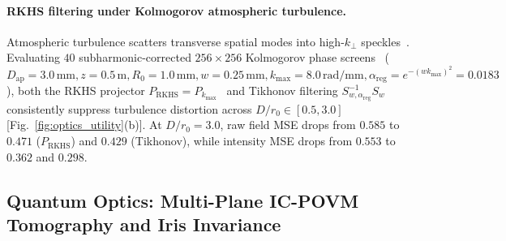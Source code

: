 \documentclass[aps,pra,onecolumn,notitlepage,11pt,tightenlines,amsmath,amssymb,floatfix,longbibliography]{revtex4-2}
\begin{document}
\paragraph*{RKHS filtering under Kolmogorov atmospheric turbulence.}
Atmospheric turbulence scatters transverse spatial modes into high-$k_\perp$ speckles~\cite{Paterson2005,TylerBoyd2009,AndrewsPhillips2005}. Evaluating $40$ subharmonic-corrected $256\times 256$ Kolmogorov phase screens~\cite{Lane1992} ($D_{\mathrm{ap}} = 3.0\,\mathrm{mm}, z = 0.5\,\mathrm{m}, R_0 = 1.0\,\mathrm{mm}, w = 0.25\,\mathrm{mm}, k_{\max} = 8.0\,\mathrm{rad/mm}, \alpha_{\mathrm{reg}} = e^{-(wk_{\max})^2} = 0.0183$), both the RKHS projector $P_{\mathrm{RKHS}} = P_{k_{\max}}$~\cite{PaulsenRaghupathi2016} and Tikhonov filtering $S_{w,\alpha_{\mathrm{reg}}}^{-1}S_w$ consistently suppress turbulence distortion across $D/r_0 \in [0.5,3.0]$ [Fig.~\ref{fig:optics_utility}(b)]. At $D/r_0 = 3.0$, raw field MSE drops from $0.585$ to $0.471$ ($P_{\mathrm{RKHS}}$) and $0.429$ (Tikhonov), while intensity MSE drops from $0.553$ to $0.362$ and $0.298$.

\subsection{Quantum Optics: Multi-Plane IC-POVM Tomography and Iris Invariance}
\label{subsec:quantum_utility}
\end{document}

